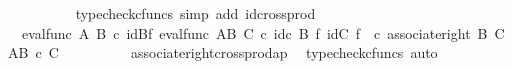 \begin{isabellebody}
\ \ \ \ \ \ \ \ \isamarkupfalse%
\ {\isacharparenleft}{\kern0pt}typecheck{\isacharunderscore}{\kern0pt}cfuncs{\isacharcomma}{\kern0pt}\ simp\ add{\isacharcolon}{\kern0pt}\ id{\isacharunderscore}{\kern0pt}cross{\isacharunderscore}{\kern0pt}prod{\isacharparenright}{\kern0pt}\isanewline
\ \ \ \ \ \ \isamarkupfalse%
\ \isamarkupfalse%
\ {\isachardoublequoteopen}{\isachardot}{\kern0pt}{\isachardot}{\kern0pt}{\isachardot}{\kern0pt}\ {\isacharequal}{\kern0pt}{\isacharparenleft}{\kern0pt}eval{\isacharunderscore}{\kern0pt}func\ A\ B{\isacharparenright}{\kern0pt}\ {\isasymcirc}\isactrlsub c\ {\isacharparenleft}{\kern0pt}{\isacharparenleft}{\kern0pt}id{\isacharparenleft}{\kern0pt}B{\isacharparenright}{\kern0pt}{\isasymtimes}\isactrlsub f\ eval{\isacharunderscore}{\kern0pt}func\ {\isacharparenleft}{\kern0pt}A\isactrlbsup B\isactrlesup {\isacharparenright}{\kern0pt}\ C{\isacharparenright}{\kern0pt}\ {\isasymcirc}\isactrlsub c\ {\isacharparenleft}{\kern0pt}{\isacharparenleft}{\kern0pt}id\isactrlsub c\ {\isacharparenleft}{\kern0pt}B{\isacharparenright}{\kern0pt}\ {\isasymtimes}\isactrlsub f\ {\isacharparenleft}{\kern0pt}id{\isacharparenleft}{\kern0pt}C{\isacharparenright}{\kern0pt}\ {\isasymtimes}\isactrlsub f\ {\isasymphi}\isactrlsup {\isasymsharp}\isactrlsup {\isasymsharp}{\isacharparenright}{\kern0pt}{\isacharparenright}{\kern0pt}\ {\isasymcirc}\isactrlsub c\ {\isacharparenleft}{\kern0pt}associate{\isacharunderscore}{\kern0pt}right\ B\ C\ {\isacharparenleft}{\kern0pt}A\isactrlbsup {\isacharparenleft}{\kern0pt}B\ {\isasymtimes}\isactrlsub c\ C{\isacharparenright}{\kern0pt}\isactrlesup {\isacharparenright}{\kern0pt}{\isacharparenright}{\kern0pt}{\isacharparenright}{\kern0pt}{\isacharparenright}{\kern0pt}{\isachardoublequoteclose}\isanewline
\ \ \ \ \ \ \ \ \isamarkupfalse%
\ associate{\isacharunderscore}{\kern0pt}right{\isacharunderscore}{\kern0pt}crossprod{\isacharunderscore}{\kern0pt}ap\ \isamarkupfalse%
\ {\isacharparenleft}{\kern0pt}typecheck{\isacharunderscore}{\kern0pt}cfuncs{\isacharcomma}{\kern0pt}\ auto{\isacharparenright}{\kern0pt}\isanewline
\ \ \ \ \ \ \isamarkupfalse%
\ \isamarkupfalse%

\end{isabellebody}

